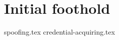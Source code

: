 \documentclass{article}
\begin{document}
\section{Initial foothold}

{spoofing.tex}
{credential-acquiring.tex}
\end{document}
